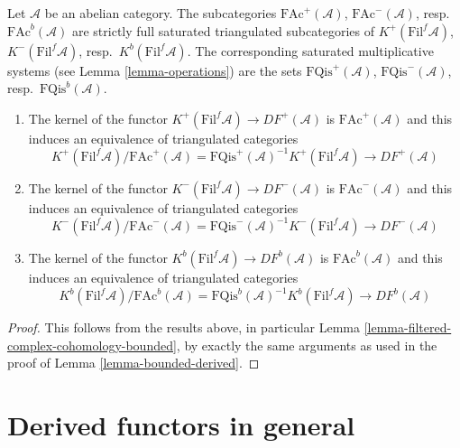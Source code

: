 \begin{lemma}
\label{lemma-filtered-bounded-derived}
Let $\mathcal{A}$ be an abelian category. The subcategories
$\text{FAc}^{+}(\mathcal{A})$, $\text{FAc}^{-}(\mathcal{A})$,
resp.\ $\text{FAc}^b(\mathcal{A})$
are strictly full saturated triangulated subcategories
of $K^{+}(\text{Fil}^f\mathcal{A})$, $K^{-}(\text{Fil}^f\mathcal{A})$,
resp.\ $K^b(\text{Fil}^f\mathcal{A})$.
The corresponding saturated multiplicative systems (see
Lemma \ref{lemma-operations})
are the sets $\text{FQis}^{+}(\mathcal{A})$, $\text{FQis}^{-}(\mathcal{A})$,
resp.\ $\text{FQis}^b(\mathcal{A})$.
\begin{enumerate}
\item The kernel of the functor
$K^{+}(\text{Fil}^f\mathcal{A}) \to DF^{+}(\mathcal{A})$
is $\text{FAc}^{+}(\mathcal{A})$ and this induces an equivalence
of triangulated categories
$$
K^{+}(\text{Fil}^f\mathcal{A})/\text{FAc}^{+}(\mathcal{A}) =
\text{FQis}^{+}(\mathcal{A})^{-1}K^{+}(\text{Fil}^f\mathcal{A})
\longrightarrow
DF^{+}(\mathcal{A})
$$
\item The kernel of the functor
$K^{-}(\text{Fil}^f\mathcal{A}) \to DF^{-}(\mathcal{A})$
is $\text{FAc}^{-}(\mathcal{A})$ and this induces an equivalence
of triangulated categories
$$
K^{-}(\text{Fil}^f\mathcal{A})/\text{FAc}^{-}(\mathcal{A}) =
\text{FQis}^{-}(\mathcal{A})^{-1}K^{-}(\text{Fil}^f\mathcal{A})
\longrightarrow
DF^{-}(\mathcal{A})
$$
\item The kernel of the functor
$K^b(\text{Fil}^f\mathcal{A}) \to DF^b(\mathcal{A})$
is $\text{FAc}^b(\mathcal{A})$ and this induces an equivalence
of triangulated categories
$$
K^b(\text{Fil}^f\mathcal{A})/\text{FAc}^b(\mathcal{A}) =
\text{FQis}^b(\mathcal{A})^{-1}K^b(\text{Fil}^f\mathcal{A})
\longrightarrow
DF^b(\mathcal{A})
$$
\end{enumerate}
\end{lemma}

\begin{proof}
This follows from the results above, in particular
Lemma \ref{lemma-filtered-complex-cohomology-bounded},
by exactly the same arguments as used in the proof of
Lemma \ref{lemma-bounded-derived}.
\end{proof}











\section{Derived functors in general}
\label{section-derived-functors}

